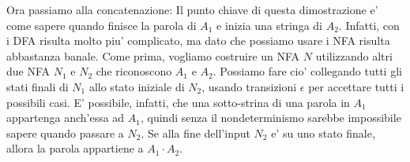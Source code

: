 Ora passiamo alla concatenazione:
Il punto chiave di questa dimostrazione e' come sapere quando finisce la parola di $ A_1 $ e inizia una stringa di $ A_2 $. Infatti, con i DFA risulta molto piu' complicato, ma dato che possiamo usare i NFA risulta abbastanza banale. Come prima, vogliamo costruire un NFA $ N $ utilizzando altri due NFA $ N_1 $ e $ N_2 $ che riconoscono $ A_1 $ e $ A_2 $. Possiamo fare cio' collegando tutti gli stati finali di $ N_1 $ allo stato iniziale di $ N_2 $, usando transizioni $ \epsilon $ per accettare tutti i possibili casi. E' possibile, infatti, che una sotto-strina di una parola in $ A_1 $ appartenga anch'essa ad $ A_1 $, quindi senza il nondeterminismo sarebbe impossibile sapere quando passare a $ N_2 $. Se alla fine dell'input $ N_2 $ e' su uno stato finale, allora la parola appartiene a $ A_1 \cdot A_2 $.
